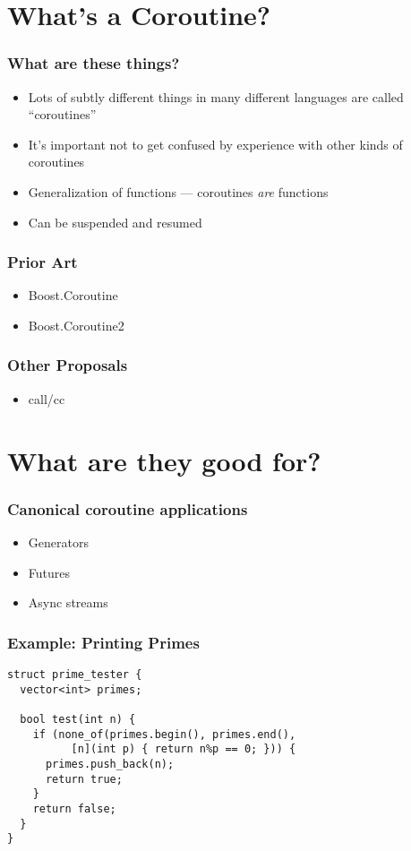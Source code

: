 \documentclass[aspectratio=43]{beamer}
\begin{document}
\section{What's a Coroutine?}

\begin{frame}
  \frametitle{What are these things?}
  \begin{itemize}
  \item Lots of subtly different things in many different languages are called ``coroutines''
  \item It's important not to get confused by experience with other kinds of coroutines
    \pause
  \item Generalization of functions --- coroutines \emph{are} functions
  \item Can be suspended and resumed
  \end{itemize}
\end{frame}

\begin{frame}
  \frametitle{Prior Art}
  \begin{itemize}
  \item Boost.Coroutine
  \item Boost.Coroutine2
  \end{itemize}
\end{frame}

\begin{frame}
  \frametitle{Other Proposals}
  \begin{itemize}
  \item call/cc
  \end{itemize}
\end{frame}


\section{What are they good for?}

\begin{frame}
  \frametitle{Canonical coroutine applications}
  \begin{itemize}
  \item Generators
  \item Futures
  \item Async streams
  \end{itemize}
\end{frame}

\begin{frame}
  \frametitle{Example: Printing Primes}
\begin{lstlisting}
struct prime_tester {
  vector<int> primes;

  bool test(int n) {
    if (none_of(primes.begin(), primes.end(),
          [n](int p) { return n%p == 0; })) {
      primes.push_back(n);
      return true;
    }
    return false;
  }
}
\end{lstlisting}
\end{frame}
\end{document}
